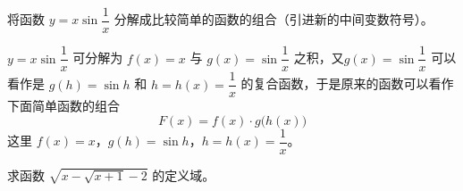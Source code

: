 \begin{example}
    将函数 $y=x\sin\dfrac{1}{x}$ 分解成比较简单的函数的组合（引进新的中间变数符号）。
\end{example}

\begin{solution}
$y=x\sin\dfrac{1}{x}$ 可分解为 $f(x)=x$ 与 $g(x)=\sin\dfrac{1}{x}$ 之积，又$g(x)=\sin\dfrac{1}{x}$ 可以看作是 $g(h)=\sin h$ 和 $h=h(x)=\dfrac{1}{x}$ 的复合函数，于是原来的函数可以看作下面简单函数的组合
\[F(x)=f(x)\cdot g\big(h(x)\big)\]
这里 $f(x)=x$，$g(h)=\sin h$，$h=h(x)=\dfrac{1}{x}$。    
\end{solution}

\begin{example}
求函数 $\sqrt{x-\sqrt{x+1}-2}$ 的定义域。
\end{example}

